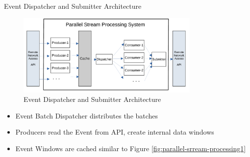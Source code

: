 \documentclass[9pt]{beamer}
\begin{document}
\begin{frame}[fragile]{Event Dispatcher and Submitter Architecture }
    
    \begin{figure}[h]
        \begin{center}
            \includegraphics[width=0.8\textwidth]{../paper/images/Parallel-Stream-Processing-System}
            \caption{Event Dispatcher and Submitter Architecture}
            \label{fig:parallel-srream-processing}
        \end{center}
    \end{figure}


    \begin{itemize}
        \item Event Batch Dispatcher distributes the batches
        \item Producers read the Event from API, create internal data windows
        \item Event Windows are cached similar to Figure \ref{fig:parallel-srream-processing1} 
    \end{itemize}
    
\end{frame}



\end{document}
